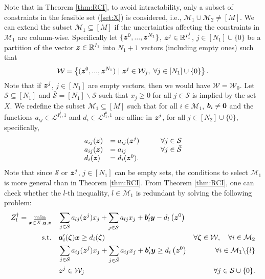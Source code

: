 \documentclass[fleqn,orsc,blindrev]{informs4}
\newcommand{\mb}[1]{\mbox{\boldmath \ensuremath{#1}}}
\renewcommand{\Re}{\mathbb{R}}
\begin{document}
		Note that in Theorem \ref{thm:RCI}, to avoid intractability, only a subset of constraints in the feasible set (\ref{set:X}) is considered, i.e.,  $\mathcal{M}_1 \cup \mathcal{M}_2  \ne [M]$. We can extend the subset $\mathcal{M}_1 \subseteq[M]$ if the uncertainties affecting the constraints in $\mathcal{M}_1$ are column-wise.
		Specifically let $\{ \mb{z}^0,...,\mb{z}^{N_1}\}$, $\mb{z}^j\in \Re^{I_1^j}$, $j \in [N_1]\cup\{0\}$ be a partition of the vector $\mb{z} \in \mathbb{R}^{I_1}$ into $N_1+1$ vectors  (including empty ones) such that 
\begin{equation} \label{set:UScw} 
			\mathcal{W} = \left\{ (\mb{z}^0,...,\mb{z}^{N_1}) \hspace{3pt} | \hspace{3pt} \mb{z}^j \in \mathcal{W}_j, \hspace{3pt} \forall j \in [N_1]\cup \{0\} \right\}.
\end{equation}
		Note that if $\mb{z}^j$, $j \in [N_1]$ are empty vectors, then we would have $\mathcal{W} = \mathcal{W}_0$.  
		Let $\mathcal{S} \subseteq [N_1]$ and $\bar{\mathcal{S}} =[N_1] \backslash \mathcal{S}$ such that $x_j \geq 0$ for all $j \in \mathcal{S}$ is implied by the set $X$.  
		We redefine the subset $\mathcal{M}_1 \subseteq [M]$  such that for all $i \in  \mathcal{M}_1$, $\mb{b}_i \neq \mb{0}$ and  the functions $a_{ij}\in \mathcal{L}^{I_1^j, 1}$  and $d_i \in \mathcal{L}^{I_1^0, 1}$ are affine in  $\mb{z}^j$, for all $j \in [N_2]\cup \{0\}$, specifically, 
\begin{equation*}
		\begin{array}{lll}
		a_{ij}(\mb{z}) &= a_{ij}(\mb{z}^j) & \qquad\forall j \in \mathcal{S}\\
		a_{ij}(\mb{z}) &= a_{ij} & \qquad\forall j \in \bar{\mathcal{S}}\\
		d_i(\mb{z}) &= d_i(\mb{z}^0).
		\end{array}
\end{equation*}
		Note that since $\mathcal{S}$ or $\mb{z}^j$, $j \in [N_1]$ can be empty sets, the conditions to select $\mathcal{M}_1$ is more general than in Theorem \ref{thm:RCI}.  From Theorem \ref{thm:RCI}, one can check whether the $l$-th inequality, $l \in \mathcal{M}_1$  is redundant by solving the following problem:
\begin{equation}\label{mol:RCIcw}
			\begin{aligned} 
				Z^\dag_l =	\min_{ \boldsymbol{x} \in X , \boldsymbol{y}, \boldsymbol{z}} \quad &  \sum_{j\in \mathcal{S}} a_{lj}(\mb{z}^j) x_j + \sum_{j\in \bar{\mathcal{S} }} a_{lj} x_j  + \mb{b}'_l \mb{y} - d_l\left(\mb{z}^0\right)  \\
				{\rm s.t.}  \quad &  \mb{a}'_i(\mb{\zeta})\mb{x} \geq d_i(\mb{\zeta}) &  \forall  \mb{\zeta} \in  \mathcal{W}, \quad \forall i  \in \mathcal{M}_2 \\
				\quad &  \sum_{j\in \mathcal{S}} a_{ij}(\mb{z}^j) x_j + \sum_{j\in \bar{\mathcal{S} }} a_{ij} x_j  +\mb{b}'_i \mb{y} \geq d_i\left(\mb{z}^0\right)  &  \forall i  \in \mathcal{M}_1 \backslash \{l\} \\
				\quad & \mb{z}^j \in \mathcal{W}_j  &  \forall j  \in \mathcal{S} \cup \{0\}.
			\end{aligned}
\end{equation}
\end{document}
